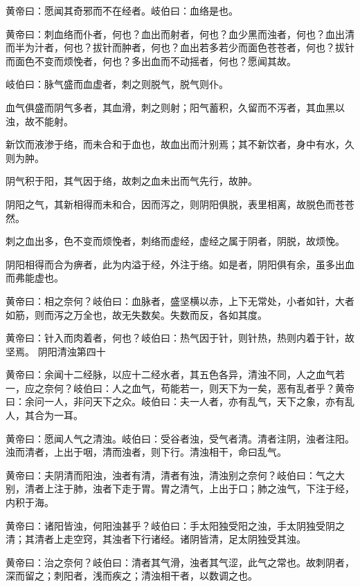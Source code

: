 \documentclass[a4paper,12pt,UTF8,twoside]{ctexbook}
\begin{document}
	黄帝曰：愿闻其奇邪而不在经者。岐伯曰：血络是也。
	
	黄帝曰：刺血络而仆者，何也？血出而射者，何也？血少黑而浊者，何也？血出清而半为汁者，何也？拔针而肿者，何也？血出若多若少而面色苍苍者，何也？拔针而面色不变而烦悗者，何也？多出血而不动摇者，何也？愿闻其故。
	
	岐伯曰：脉气盛而血虚者，刺之则脱气，脱气则仆。
	
	血气俱盛而阴气多者，其血滑，刺之则射；阳气蓄积，久留而不泻者，其血黑以浊，故不能射。
	
	新饮而液渗于络，而未合和于血也，故血出而汁别焉；其不新饮者，身中有水，久则为肿。
	
	阴气积于阳，其气因于络，故刺之血未出而气先行，故肿。
	
	阴阳之气，其新相得而未和合，因而泻之，则阴阳俱脱，表里相离，故脱色而苍苍然。
	
	刺之血出多，色不变而烦悗者，刺络而虚经，虚经之属于阴者，阴脱，故烦悗。
	
	阴阳相得而合为痹者，此为内溢于经，外注于络。如是者，阴阳俱有余，虽多出血而弗能虚也。
	
	黄帝曰：相之奈何？岐伯曰：血脉者，盛坚横以赤，上下无常处，小者如针，大者如筋，则而泻之万全也，故无失数矣。失数而反，各如其度。
	
	黄帝曰：针入而肉着者，何也？岐伯曰：热气因于针，则针热，热则内着于针，故坚焉。
	阴阳清浊第四十
	
	黄帝曰：余闻十二经脉，以应十二经水者，其五色各异，清浊不同，人之血气若一，应之奈何？岐伯曰：人之血气，苟能若一，则天下为一矣，恶有乱者乎？黄帝曰：余问一人，非问天下之众。岐伯曰：夫一人者，亦有乱气，天下之象，亦有乱人，其合为一耳。
	
	黄帝曰：愿闻人气之清浊。岐伯曰：受谷者浊，受气者清。清者注阴，浊者注阳。浊而清者，上出于咽，清而浊者，则下行。清浊相干，命曰乱气。
	
	黄帝曰：夫阴清而阳浊，浊者有清，清者有浊，清浊别之奈何？岐伯曰：气之大别，清者上注于肺，浊者下走于胃。胃之清气，上出于口；肺之浊气，下注于经，内积于海。
	
	黄帝曰：诸阳皆浊，何阳浊甚乎？岐伯曰：手太阳独受阳之浊，手太阴独受阴之清；其清者上走空窍，其浊者下行诸经。诸阴皆清，足太阴独受其浊。
	
	黄帝曰：治之奈何？岐伯曰：清者其气滑，浊者其气涩，此气之常也。故刺阴者，深而留之；刺阳者，浅而疾之；清浊相干者，以数调之也。
	
	\part{}
\end{document}
